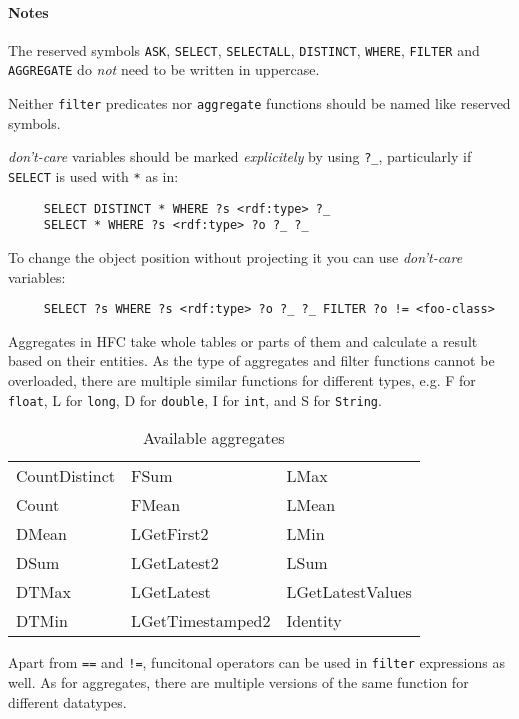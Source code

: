 \paragraph{Notes}

The reserved symbols \texttt{ASK}, \texttt{SELECT}, \texttt{SELECTALL},
\texttt{DISTINCT}, \texttt{WHERE}, \texttt{FILTER} and \texttt{AGGREGATE}
do \emph{not} need to be written in uppercase.

Neither \texttt{filter} predicates nor \texttt{aggregate} functions should be named like reserved symbols.

\emph{don't-care} variables should be marked \emph{explicitely} by using
\verb|?_|, particularly if \texttt{SELECT} is used with \verb|*| as in:
\begin{verbatim}
     SELECT DISTINCT * WHERE ?s <rdf:type> ?_
     SELECT * WHERE ?s <rdf:type> ?o ?_ ?_
\end{verbatim}
To change the object position without projecting it you can use \emph{don't-care} variables:
\begin{verbatim}
     SELECT ?s WHERE ?s <rdf:type> ?o ?_ ?_ FILTER ?o != <foo-class>
\end{verbatim}

Aggregates in HFC take whole tables or parts of them and calculate a result based on their entities. As the type of aggregates and filter functions cannot be overloaded, there are multiple similar functions for different types, e.g. F for \texttt{float}, L for \texttt{long}, D for \texttt{double}, I
for \texttt{int}, and S for \texttt{String}.

\begin{table}[htbp]
  \centering
 \begin{tabular}{lll}
   CountDistinct&  FSum&             LMax\\
   Count&          FMean&            LMean\\
   DMean&          LGetFirst2&       LMin\\
   DSum&           LGetLatest2&      LSum\\
   DTMax&          LGetLatest&       LGetLatestValues\\
   DTMin&          LGetTimestamped2& Identity     \\
 \end{tabular}
  \caption{Available aggregates}
  \label{tab:hfcaggregates}
\end{table}

Apart from \verb|==| and \verb|!=|, funcitonal operators can be used in \texttt{filter} expressions as well. As for aggregates, there are multiple versions of the same function for different datatypes.

